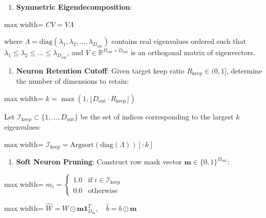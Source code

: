 \begin{enumerate}
\item \textbf{Symmetric Eigendecomposition}:
\end{enumerate}
\begin{center}
\begin{adjustbox}{max width=\columnwidth}
$\displaystyle
C V = V \Lambda
$
\end{adjustbox}
\end{center}
where $\Lambda = \text{diag}(\lambda_1, \lambda_2, \dots, \lambda_{D_{\text{out}}})$ contains real eigenvalues ordered such that $\lambda_1 \le \lambda_2 \le \dots \le \lambda_{D_{\text{out}}}$, and $V \in \mathbb{R}^{D_{\text{out}} \times D_{\text{out}}}$ is an orthogonal matrix of eigenvectors.

\begin{enumerate}
\item \textbf{Neuron Retention Cutoff}:
Given target keep ratio $R_{\text{keep}} \in (0, 1]$, determine the number of dimensions to retain:
\end{enumerate}
\begin{center}
\begin{adjustbox}{max width=\columnwidth}
$\displaystyle
k = \max\left(1, \lfloor D_{\text{out}} \cdot R_{\text{keep}} \rfloor\right)
$
\end{adjustbox}
\end{center}
Let $\mathcal{I}_{\text{keep}} \subset \{1, \dots, D_{\text{out}}\}$ be the set of indices corresponding to the largest $k$ eigenvalues:
\begin{center}
\begin{adjustbox}{max width=\columnwidth}
$\displaystyle
\mathcal{I}_{\text{keep}} = \text{Argsort}(\text{diag}(\Lambda))[:k]
$
\end{adjustbox}
\end{center}

\begin{enumerate}
\item \textbf{Soft Neuron Pruning}:
Construct row mask vector $\mathbf{m} \in \{0, 1\}^{D_{\text{out}}}$:
\end{enumerate}
\begin{center}
\begin{adjustbox}{max width=\columnwidth}
$\displaystyle
m_i = \begin{cases} 1.0 & \text{if } i \in \mathcal{I}_{\text{keep}} \\ 0.0 & \text{otherwise} \end{cases}
$
\end{adjustbox}
\end{center}
\begin{center}
\begin{adjustbox}{max width=\columnwidth}
$\displaystyle
\widehat{W} = W \odot \mathbf{m} \mathbf{1}_{D_{\text{in}}}^T, \quad \widehat{b} = b \odot \mathbf{m}
$
\end{adjustbox}
\end{center}


